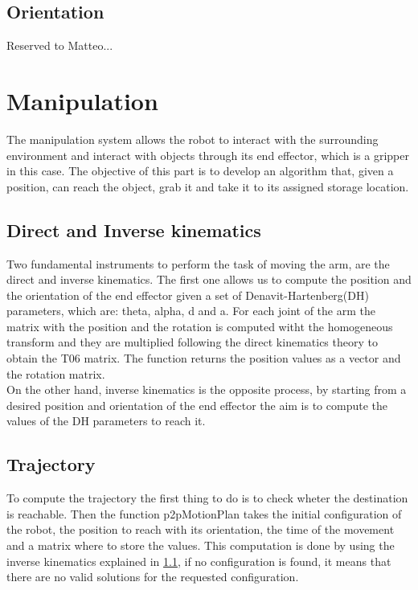 \documentclass[12pt,a4paper]{article}
\begin{document}
\subsection{Orientation}\label{subsec:orientation}
Reserved to Matteo...

\section{Manipulation}\label{sec:manipulation}
The manipulation system allows the robot to interact with the surrounding environment and interact with objects through its end effector, which is a gripper in this case.
The objective of this part is to develop an algorithm that, given a position, can reach the object, grab it and take it to its assigned storage location.
\subsection{Direct and Inverse kinematics}\label{subsec:kinematics}
Two fundamental instruments to perform the task of moving the arm, are the direct and inverse kinematics. The first one allows us to compute the position and the orientation of the end effector given a set of Denavit-Hartenberg(DH) parameters, which are: theta, alpha, d and a. For each joint of the arm the matrix with the position and the rotation is computed witht the homogeneous transform and they are multiplied following the direct kinematics theory to obtain the T06 matrix. The function returns the position values as a vector and the rotation matrix.\\
On the other hand, inverse kinematics is the opposite process, by starting from a desired position and orientation of the end effector the aim is to compute the values of the DH parameters to reach it.

\subsection{Trajectory}\label{subsec:trajectory}
To compute the trajectory the first thing to do is to check wheter the destination is reachable. Then the function p2pMotionPlan takes the initial configuration of the robot, the position to reach with its orientation, the time of the movement and a matrix where to store the values. This computation is done by using the inverse kinematics explained in \ref{subsec:kinematics}, if no configuration is found, it means that there are no valid solutions for the requested configuration.
\end{document}
